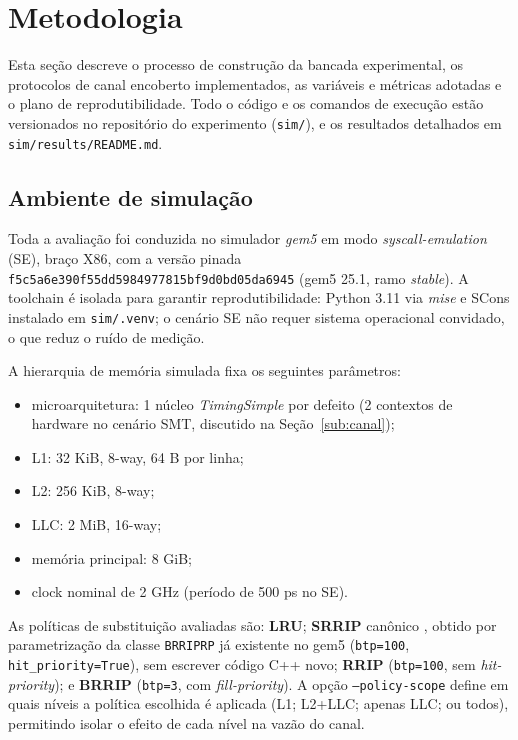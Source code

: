 \section{Metodologia}

Esta seção descreve o processo de construção da bancada experimental, os
protocolos de canal encoberto implementados, as variáveis e métricas
adotadas e o plano de reprodutibilidade. Todo o código e os comandos de
execução estão versionados no repositório do experimento
(\texttt{sim/}), e os resultados detalhados em \texttt{sim/results/README.md}.

\subsection{Ambiente de simulação}

Toda a avaliação foi conduzida no simulador \textit{gem5} em modo
\textit{syscall-emulation} (SE), braço X86, com a versão pinada
\texttt{f5c5a6e390f55dd5984977815bf9d0bd05da6945} (gem5 25.1, ramo
\textit{stable}). A toolchain é isolada para garantir reprodutibilidade:
Python 3.11 via \textit{mise} e SCons instalado em \texttt{sim/.venv}; o
cenário SE não requer sistema operacional convidado, o que reduz o ruído de
medição.

A hierarquia de memória simulada fixa os seguintes parâmetros:

\begin{itemize}
    \item microarquitetura: 1 núcleo \textit{TimingSimple} por defeito
          (2 contextos de hardware no cenário SMT, discutido na
          Seção~\ref{sub:canal});
    \item L1: 32 KiB, 8-way, 64 B por linha;
    \item L2: 256 KiB, 8-way;
    \item LLC: 2 MiB, 16-way;
    \item memória principal: 8 GiB;
    \item clock nominal de 2 GHz (período de 500 ps no SE).
\end{itemize}

As políticas de substituição avaliadas são: \textbf{LRU}; \textbf{SRRIP}
canônico \cite{10.1145/1815961.1815971}, obtido por parametrização da classe
\texttt{BRRIPRP} já existente no gem5 (\texttt{btp=100},
\texttt{hit\_priority=True}), sem escrever código C++ novo; \textbf{RRIP}
(\texttt{btp=100}, sem \textit{hit-priority}); e \textbf{BRRIP}
(\texttt{btp=3}, com \textit{fill-priority}). A opção
\texttt{--policy-scope} define em quais níveis a política escolhida é
aplicada (L1; L2+LLC; apenas LLC; ou todos), permitindo isolar o efeito de
cada nível na vazão do canal.

